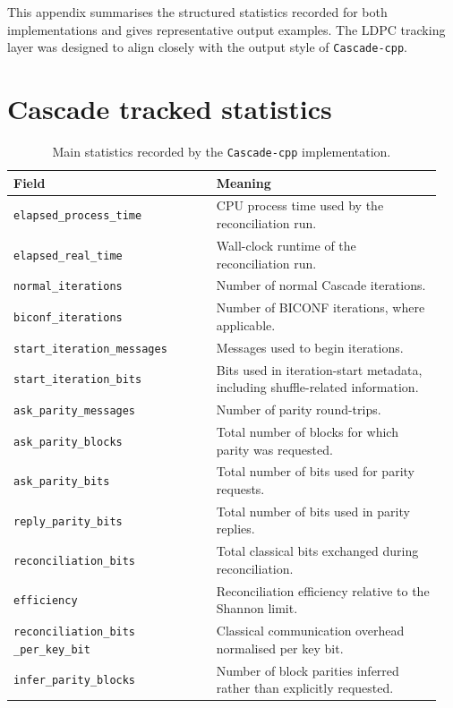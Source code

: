 \documentclass{UoYCSproject}
\begin{document}
This appendix summarises the structured statistics recorded for both
implementations and gives representative output examples. The LDPC tracking
layer was designed to align closely with the output style of
\texttt{Cascade-cpp}.

\section{Cascade tracked statistics}

\begin{table}[!htbp]
    \centering
    \small
    \setlength{\tabcolsep}{4pt}
    \renewcommand{\arraystretch}{1.05}
    \begin{tabular}{p{0.45\linewidth} p{0.5\linewidth}}
        \hline
        Field & Meaning \\
        \hline
        \texttt{elapsed\_process\_time} & CPU process time used by the reconciliation run. \\
        \texttt{elapsed\_real\_time} & Wall-clock runtime of the reconciliation run. \\
        \texttt{normal\_iterations} & Number of normal Cascade iterations. \\
        \texttt{biconf\_iterations} & Number of BICONF iterations, where applicable. \\
        \texttt{start\_iteration\_messages} & Messages used to begin iterations. \\
        \texttt{start\_iteration\_bits} & Bits used in iteration-start metadata, including shuffle-related information. \\
        \texttt{ask\_parity\_messages} & Number of parity round-trips. \\
        \texttt{ask\_parity\_blocks} & Total number of blocks for which parity was requested. \\
        \texttt{ask\_parity\_bits} & Total number of bits used for parity requests. \\
        \texttt{reply\_parity\_bits} & Total number of bits used in parity replies. \\
        \texttt{reconciliation\_bits} & Total classical bits exchanged during reconciliation. \\
        \texttt{efficiency} & Reconciliation efficiency relative to the Shannon limit. \\
        \texttt{reconciliation\_bits
        \_per\_key\_bit} & Classical communication overhead normalised per key bit. \\
        \texttt{infer\_parity\_blocks} & Number of block parities inferred rather than explicitly requested. \\
        \hline
    \end{tabular}
    \caption{Main statistics recorded by the \texttt{Cascade-cpp} implementation.}
    \label{tab:Cascade-tracking-fields}
\end{table}
\end{document}

